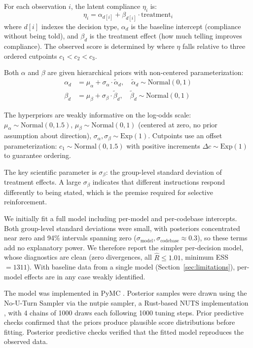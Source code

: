 \documentclass{llncs}
\begin{document}
For each observation $i$, the latent compliance $\eta_i$ is:
\begin{equation}
  \eta_i = \alpha_{d[i]} + \beta_{d[i]} \cdot \text{treatment}_i
\end{equation}
where $d[i]$ indexes the decision type, $\alpha_d$ is the baseline
intercept (compliance without being told), and $\beta_d$ is the
treatment effect (how much telling improves compliance). The observed
score is determined by where $\eta$ falls relative to three ordered
cutpoints $c_1 < c_2 < c_3$.

Both $\alpha$ and $\beta$ are given hierarchical priors with
non-centered parameterization:
\begin{align}
  \alpha_d &= \mu_\alpha + \sigma_\alpha \cdot \tilde{\alpha}_d, \quad
    \tilde{\alpha}_d \sim \text{Normal}(0, 1) \\
  \beta_d &= \mu_\beta + \sigma_\beta \cdot \tilde{\beta}_d, \quad
    \tilde{\beta}_d \sim \text{Normal}(0, 1)
\end{align}

The hyperpriors are weakly informative on the log-odds scale:
$\mu_\alpha \sim \text{Normal}(0, 1.5)$,
$\mu_\beta \sim \text{Normal}(0, 1)$ (centered at zero, no prior
assumption about direction),
$\sigma_\alpha, \sigma_\beta \sim \text{Exp}(1)$.
Cutpoints use an offset parameterization:
$c_1 \sim \text{Normal}(0, 1.5)$ with positive increments
$\Delta c \sim \text{Exp}(1)$ to guarantee ordering.

The key scientific parameter is $\sigma_\beta$: the group-level
standard deviation of treatment effects. A large $\sigma_\beta$
indicates that different instructions respond differently to being
stated, which is the premise required for selective reinforcement.

We initially fit a full model including per-model and per-codebase
intercepts. Both group-level standard deviations were small, with
posteriors concentrated near zero and 94\% intervals spanning zero
($\sigma_\text{model}, \sigma_\text{codebase} \approx 0.3$), so these
terms add no explanatory power. We therefore report the simpler
per-decision model, whose diagnostics are clean (zero divergences, all
$\hat{R} \leq 1.01$, minimum ESS $= 1311$). With baseline data from a
single model (Section~\ref{sec:limitations}), per-model effects are in
any case weakly identified.

The model was implemented in PyMC \parencite{pymc2023}. Posterior
samples were drawn using the No-U-Turn Sampler
\parencite[NUTS;][]{hoffman2014} via the nutpie sampler, a Rust-based
NUTS implementation \parencite{nutpie2024}, with 4 chains of 1000
draws each following 1000 tuning steps. Prior predictive checks confirmed that the priors
produce plausible score distributions before fitting. Posterior
predictive checks verified that the fitted model reproduces the observed
data.
\end{document}
